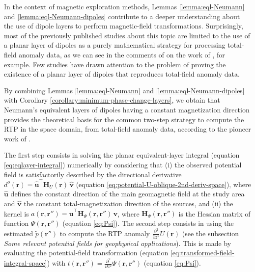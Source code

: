 In the context of magnetic exploration methods, Lemmas \ref{lemma:eql-Neumann} and 
\ref{lemma:eql-Neumann-dipoles} contribute to a deeper understanding about the use 
of dipole layers to perform magnetic-field transformations.
Surprisingly, most of the previously published studies about this topic are limited to
the use of a planar layer of dipoles as a purely mathematical strategy for processing total-field 
anomaly data, as we can see in the comments of \citet{pedersen1989} on the work of \citet{bhattacharyya_chan1977},
for example.
Few studies \cite[][]{pedersen1991, li_etal2014, reis_etal2020} have drawn
attention to the problem of proving the existence of a planar layer of dipoles
that reproduces total-field anomaly data.

By combining Lemmas \ref{lemma:eql-Neumann} and \ref{lemma:eql-Neumann-dipoles} with
Corollary \ref{corollary:minimum-phase-change-layers}, we obtain that
Neumann's equivalent layers of dipoles having a constant magnetization direction 
provides the theoretical basis for the common two-step strategy to compute the RTP in the space domain, 
from total-field anomaly data, according to the pioneer work of \citet{silva1986}.

The first step consists in solving the planar equivalent-layer integral (equation \ref{eq:eqlayer-integral})
numerically by considering that (i) the observed potential field 
is satisfactorily described by the directional derivative $d^{o}(\mathbf{r}) = \hat{\mathbf{u}}^{\top} \mathbf{H}_{U}(\mathbf{r}) \, \hat{\mathbf{v}}$ 
(equation \ref{eq:potential-U-oblique-2nd-deriv-space}), where $\hat{\mathbf{u}}$ defines the constant direction of the main geomagnetic
field at the study area and $\hat{\mathbf{v}}$ the constant total-magnetization direction of the sources, and (ii)
the kernel is $a(\mathbf{r}, \mathbf{r}'') = \hat{\mathbf{u}}^{\top} \mathbf{H}_{\Psi}(\mathbf{r}, \mathbf{r}'') \, \hat{\mathbf{v}}$,
where $\mathbf{H}_{\Psi}(\mathbf{r}, \mathbf{r}'')$ is the Hessian matrix \citep[e.g.,][ p. 158]{kaplan2002} of
function $\Psi(\mathbf{r}, \mathbf{r}'')$ (equation \ref{eq:Psi}).
The second step consists in using the estimated $\tilde{p}(\mathbf{r}'')$ to compute the RTP anomaly 
$\tfrac{\partial^{2}}{\partial z^{2}} U(\mathbf{r})$ (see the subsection \textit{Some relevant potential fields for geophysical applications}).
This is made by evaluating the potential-field transformation (equation \ref{eq:transformed-field-integral-space}) 
with $t(\mathbf{r}, \mathbf{r}'') = \tfrac{\partial^{2}}{\partial z^{2}} \Psi(\mathbf{r}, \mathbf{r}'')$ 
(equation \ref{eq:Psi}).

